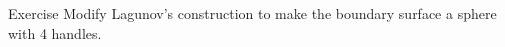 \begin{thm}{Exercise}\label{ex:lagunov-genus4}
Modify Lagunov's construction to make the boundary surface a sphere with 4 handles.
\end{thm}



